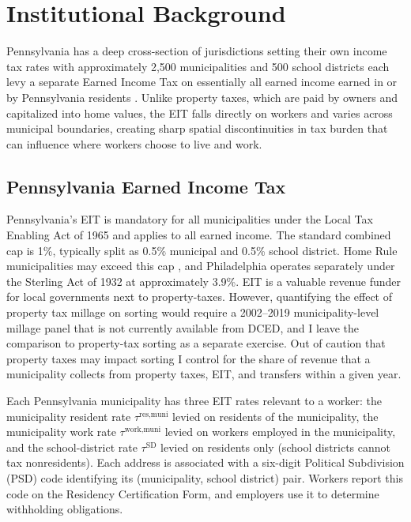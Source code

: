 \documentclass[12pt]{article}
\begin{document}
\section{Institutional Background}
\label{sec:background}

Pennsylvania has a deep cross-section of jurisdictions setting
their own income tax rates with approximately 2{,}500 municipalities and 500 school
districts each levy a separate Earned Income Tax on essentially
all earned income earned in or by Pennsylvania residents
\citep{bagchiEffectsIntroducingWithholding2022,agrawalLessonsStateLocal}.
Unlike property taxes, which are paid by owners and capitalized into
home values, the EIT falls directly on workers and varies across
municipal boundaries, creating
sharp spatial discontinuities in tax burden that can influence where
workers choose to live and work.

\subsection{Pennsylvania Earned Income Tax}
\label{subsec:pennsylvania}

Pennsylvania's EIT is mandatory for all municipalities under the
Local Tax Enabling Act of 1965 \citep[Act 511;][]{paAct511_1965} and applies to all earned income. The standard combined cap is 1\%, typically split as
0.5\% municipal and 0.5\% school district. Home Rule municipalities
may exceed this cap \citep{paHomeRule}, and Philadelphia operates
separately under the Sterling Act of 1932
\citep{paSterlingAct_1932} at approximately 3.9\%. EIT is a valuable revenue funder for local governments next to property-taxes. However, quantifying the effect of property tax millage on sorting would
require a 2002--2019 municipality-level millage panel that is not currently
available from DCED, and I leave the comparison to property-tax
sorting as a separate exercise. Out of caution that property taxes may impact sorting I control for the share of revenue that a municipality collects from property taxes, EIT, and transfers within a given year.

Each Pennsylvania municipality has three EIT rates relevant to a
worker:
%
the municipality resident rate $\tau^{\text{res,muni}}$ levied on residents of the municipality, the municipality work rate $\tau^{\text{work,muni}}$ levied on workers employed in the municipality, and the school-district rate $\tau^{\text{SD}}$ levied on residents only (school districts cannot tax nonresidents).
%
Each address is associated with a six-digit Political Subdivision (PSD)
code identifying its (municipality, school district) pair. Workers report this
code on the Residency Certification Form, and employers use it to
determine withholding obligations.
\end{document}
